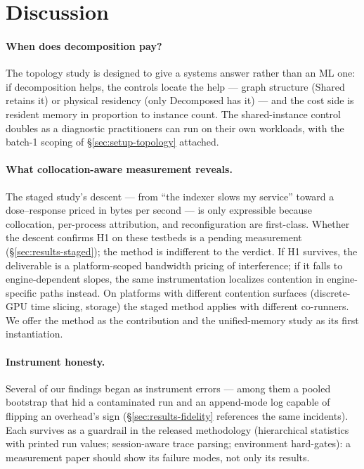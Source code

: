 \section{Discussion}
\label{sec:discussion}

\paragraph{When does decomposition pay?} The topology study is designed to
give a systems answer rather than an ML one: if decomposition helps, the
controls locate the help --- graph structure (Shared retains it) or
physical residency (only Decomposed has it) --- and the cost side is
resident memory in proportion to instance count. The shared-instance
control doubles as a diagnostic practitioners can run on their own
workloads, with the batch-1 scoping of \S\ref{sec:setup-topology}
attached.

\paragraph{What collocation-aware measurement reveals.} The staged study's
descent --- from ``the indexer slows my service'' toward a dose--response
priced in bytes per second --- is only expressible because collocation,
per-process attribution, and reconfiguration are first-class. Whether the
descent confirms H1 on these testbeds is a pending measurement
(\S\ref{sec:results-staged}); the method is indifferent to the verdict.
If H1 survives, the deliverable is a platform-scoped bandwidth pricing of
interference; if it falls to engine-dependent slopes, the same
instrumentation localizes contention in engine-specific paths instead. On
platforms with different contention surfaces (discrete-GPU time slicing,
storage) the staged method applies with different co-runners. We offer the
method as the contribution and the unified-memory study as its first
instantiation.

\paragraph{Instrument honesty.} Several of our findings began as
instrument errors --- among them a pooled bootstrap that hid a contaminated
run and an append-mode log capable of flipping an overhead's sign
(\S\ref{sec:results-fidelity} references the same incidents). Each survives
as a guardrail in the released methodology (hierarchical statistics with
printed run values; session-aware trace parsing; environment hard-gates): a
measurement paper should show its failure modes, not only its results.

